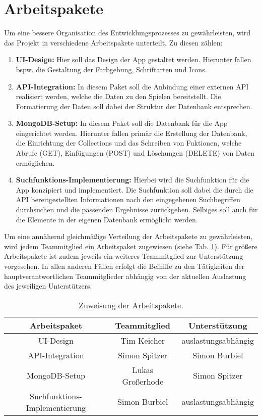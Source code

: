\section{Arbeitspakete}
Um eine bessere Organisation des Entwicklungsprozesses zu gewährleisten, wird das Projekt in verschiedene Arbeitspakete unterteilt. Zu diesen zählen:
\begin{enumerate}
    \item \textbf{UI-Design:} Hier soll das Design der App gestaltet werden. Hierunter fallen bspw. die Gestaltung der Farbgebung, Schriftarten und Icons.
    \item \textbf{API-Integration:} In diesem Paket soll die Anbindung einer externen \ac{API} realisiert werden, welche die Daten zu den Spielen bereitstellt. Die Formatierung der Daten soll dabei der Struktur der Datenbank entsprechen.
    \item \textbf{MongoDB-Setup:} In diesem Paket soll die Datenbank für die App eingerichtet werden. Hierunter fallen primär die Erstellung der Datenbank, die Einrichtung der Collections und das Schreiben von Fuktionen, welche Abrufe (GET), Einfügungen (POST) und Löschungen (DELETE) von Daten ermöglichen.
    \item \textbf{Suchfunktions-Implementierung:} Hierbei wird die Suchfunktion für die App konzipiert und implementiert. Die Suchfunktion soll dabei die durch die \ac{API} bereitgestellten Informationen nach den eingegebenen Suchbegriffen durchsuchen und die passenden Ergebnisse zurückgeben. Selbiges soll auch für die Elemente in der eigenen Datenbank ermöglicht werden.
\end{enumerate}
Um eine annähernd gleichmäßige Verteilung der Arbeitspakete zu gewährleisten, wird jedem Teammitglied ein Arbeitspaket zugewiesen (siehe Tab. \ref{tab:arbeitspakete}).
Für größere Arbeitspakete ist zudem jeweils ein weiteres Teammitglied zur Unterstützung vorgesehen.
In allen anderen Fällen erfolgt die Beihilfe zu den Tätigkeiten der hauptverantwortlichen Teammitglieder abhängig von der aktuellen Auslastung des jeweiligen Unterstützers.
\begin{table}[H]
    \centering
    \begin{tabular}{|c|c|c|}
        \hline
        \textbf{Arbeitspaket} & \textbf{Teammitglied} & \textbf{Unterstützung} \\
        \hline
        UI-Design & Tim Keicher & auslastungsabhängig \\
        API-Integration & Simon Spitzer & Simon Burbiel \\
        MongoDB-Setup & Lukas Großerhode & Simon Spitzer \\
        Suchfunktions-Implementierung & Simon Burbiel & auslastungsabhängig \\
        \hline
    \end{tabular}
    \caption{Zuweisung der Arbeitspakete.}
    \label{tab:arbeitspakete}
\end{table}